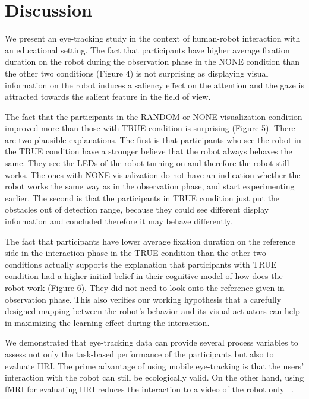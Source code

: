\documentclass{sig-alternate}
\begin{document}

\section{Discussion}

We present an eye-tracking study in the context of human-robot
interaction with an educational setting. The fact that participants have
higher average fixation duration on the robot during the observation
phase in the {\sf NONE} condition than the other two conditions (Figure 4) is
not surprising as displaying visual information on the robot induces a
saliency effect on the attention and the gaze is attracted towards the
salient feature in the field of view.

The fact that the participants in the {\sf RANDOM} or {\sf NONE} visualization
condition improved more than those with {\sf TRUE} condition is surprising
(Figure 5). There are two plausible explanations. The first is that
participants who see the robot in the {\sf TRUE} condition have a stronger
believe that the robot always behaves the same. They see the LEDs of the
robot turning on and therefore the robot still works. The ones with {\sf NONE}
visualization do not have an indication whether the robot works the same
way as in the observation phase, and start experimenting earlier. The
second is that the participants in {\sf TRUE} condition just put the obstacles
out of detection range, because they could see different display
information and concluded therefore it may behave differently.

The fact that participants have lower average fixation duration on the
reference side in the interaction phase in the {\sf TRUE} condition than the
other two conditions actually supports the explanation that participants
with {\sf TRUE} condition had a higher initial belief in their cognitive model
of how does the robot work (Figure 6). They did not need to look onto
the reference given in observation phase. This also verifies our working
hypothesis that a carefully designed mapping between the robot's
behavior and its visual actuators can help in maximizing the learning
effect during the interaction.

We demonstrated that eye-tracking data can provide several process
variables to assess not only the task-based performance of the
participants but also to evaluate HRI. The prime advantage of using
mobile eye-tracking is that the users' interaction with the robot can
still be ecologically valid. On the other hand, using fMRI for
evaluating HRI reduces the interaction to a video of the robot only
~\cite{rosenthal2013neural}.
\end{document}
